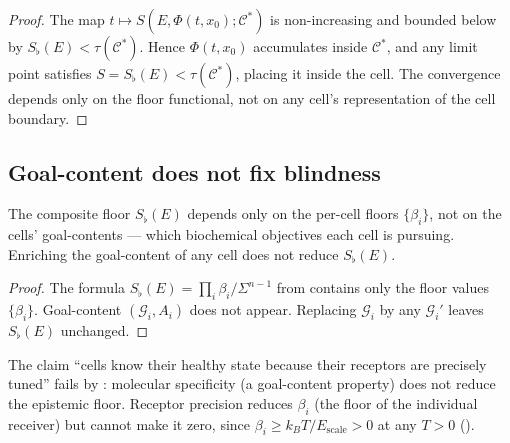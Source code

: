 \documentclass[twocolumn,11pt,a4paper]{article}
\newcommand{\Sfloor}{S_{\flat}}
\newcommand{\Cell}{\mathcal{C}}
\begin{document}
\begin{proof}
The map $t\mapsto S(E, \Phi(t,x_0); \Cell^*)$ is non-increasing and bounded
below by $\Sfloor(E) < \tau(\Cell^*)$. Hence $\Phi(t,x_0)$ accumulates
inside $\Cell^*$, and any limit point satisfies $S = \Sfloor(E) < \tau(\Cell^*)$,
placing it inside the cell. The convergence depends only on the floor
functional, not on any cell's representation of the cell boundary.
\end{proof}

\subsection{Goal-content does not fix blindness}

\begin{theorem}\label{thm:mothet}
The composite floor $\Sfloor(E)$ depends only on the per-cell floors
$\{\beta_i\}$, not on the cells' goal-contents --- which biochemical
objectives each cell is pursuing. Enriching the goal-content of any
cell does not reduce $\Sfloor(E)$.
\end{theorem}

\begin{proof}
The formula $\Sfloor(E) = \prod_i \beta_i / \Sigma^{n-1}$ from
 contains only the floor values $\{\beta_i\}$.
Goal-content $(\mathcal{G}_i, A_i)$ does not appear. Replacing
$\mathcal{G}_i$ by any $\mathcal{G}_i'$ leaves $\Sfloor(E)$ unchanged.
\end{proof}

\begin{corollary}\label{cor:no-specificity}
The claim ``cells know their healthy state because their receptors are
precisely tuned'' fails by : molecular specificity (a
goal-content property) does not reduce the epistemic floor. Receptor
precision reduces $\beta_i$ (the floor of the individual receiver) but
cannot make it zero, since $\beta_i \geq k_BT / E_{\mathrm{scale}} > 0$
at any $T > 0$ ().
\end{corollary}
\end{document}
